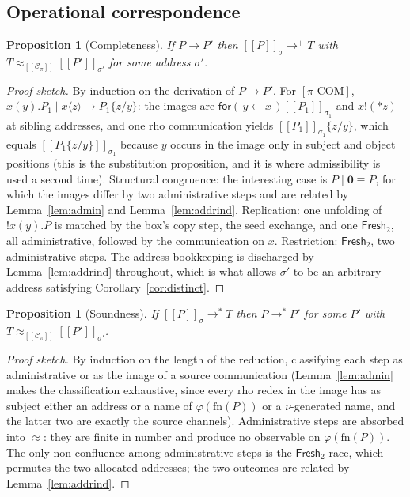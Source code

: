 \documentclass[11pt]{article}
\theoremstyle{definition}
\theoremstyle{plain}
\newtheorem{proposition}[definition]{Proposition}
\theoremstyle{remark}
\newcommand{\drp}[1]{{*}#1}
\newcommand{\inp}[3]{\mathsf{for}(\,#1 \leftarrow #2\,)#3}
\newcommand{\out}[2]{#1!(#2)}
\newcommand{\enc}[1]{[\![#1]\!]}
\newcommand{\nil}{\mathbf{0}}
\newcommand{\Frsh}{\mathsf{Fresh}_2}
\newcommand{\Ctx}{\mathscr{C}}
\newcommand{\bisim}{\approx}
\newcommand{\fn}{\mathrm{fn}}
\begin{document}
\subsection{Operational correspondence}

\begin{proposition}[Completeness]\label{prop:complete}
If $P \to P'$ then $\enc{P}_\sigma \to^{+} T$ with
$T \bisim_{\enc{\Ctx_\pi}} \enc{P'}_{\sigma'}$ for some address $\sigma'$.
\end{proposition}

\begin{proof}[Proof sketch]
By induction on the derivation of $P \to P'$. For $[\pi\text{-COM}]$,
$x(y).P_1 \mid \bar x\langle z\rangle \to P_1\{z/y\}$: the images are
$\inp{y}{x}{\enc{P_1}_{\sigma_1}}$ and $\out{x}{\drp{z}}$ at sibling
addresses, and one rho communication yields
$\enc{P_1}_{\sigma_1}\{z/y\}$, which equals
$\enc{P_1\{z/y\}}_{\sigma_1}$ because $y$ occurs in the image only in
subject and object positions (this is the substitution proposition, and it
is where admissibility is used a second time). Structural congruence:
the interesting case is $P \mid \nil \equiv P$, for which the images
differ by two administrative steps and are related by
Lemma~\ref{lem:admin} and Lemma~\ref{lem:addrind}. Replication: one
unfolding of $!x(y).P$ is matched by the box's copy step, the seed
exchange, and one $\Frsh$, all administrative, followed by the
communication on $x$. Restriction: $\Frsh$, two administrative steps.
The address bookkeeping is discharged by Lemma~\ref{lem:addrind}
throughout, which is what allows $\sigma'$ to be an arbitrary address
satisfying Corollary~\ref{cor:distinct}.
\end{proof}

\begin{proposition}[Soundness]\label{prop:sound}
If $\enc{P}_\sigma \to^* T$ then $P \to^* P'$ for some $P'$ with
$T \bisim_{\enc{\Ctx_\pi}} \enc{P'}_{\sigma'}$.
\end{proposition}

\begin{proof}[Proof sketch]
By induction on the length of the reduction, classifying each step as
administrative or as the image of a source communication
(Lemma~\ref{lem:admin} makes the classification exhaustive, since every
rho redex in the image has as subject either an address or a name of
$\varphi(\fn(P))$ or a $\nu$-generated name, and the latter two are
exactly the source channels). Administrative steps are absorbed into
$\bisim$: they are finite in number and produce no observable on
$\varphi(\fn(P))$. The only non-confluence among administrative steps is
the $\Frsh$ race, which permutes the two allocated addresses; the two
outcomes are related by Lemma~\ref{lem:addrind}.
\end{proof}
\end{document}
